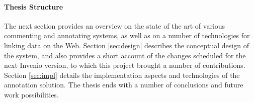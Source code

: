 
\paragraph{Thesis Structure} The next section provides an overview on the state
of the art of various commenting and annotating systems, as well as on a number
of technologies for linking data on the Web. Section \ref{sec:design} describes
the conceptual design of the system, and also provides a short account of the
changes scheduled for the next Invenio version, to which this project brought a
number of contributions. Section \ref{sec:impl} details the implementation
aspects and technologies of the annotation solution. The thesis ends with a
number of conclusions and future work possibilities.
